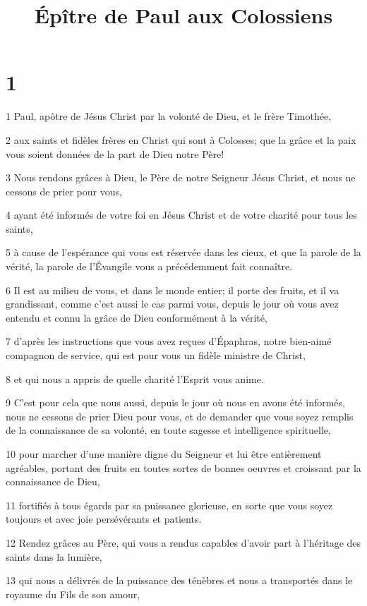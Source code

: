 

\title{Épître de Paul aux Colossiens}


\chapter{1}

\par 1 Paul, apôtre de Jésus Christ par la volonté de Dieu, et le frère Timothée,
\par 2 aux saints et fidèles frères en Christ qui sont à Colosses; que la grâce et la paix vous soient données de la part de Dieu notre Père!
\par 3 Nous rendons grâces à Dieu, le Père de notre Seigneur Jésus Christ, et nous ne cessons de prier pour vous,
\par 4 ayant été informés de votre foi en Jésus Christ et de votre charité pour tous les saints,
\par 5 à cause de l'espérance qui vous est réservée dans les cieux, et que la parole de la vérité, la parole de l'Évangile vous a précédemment fait connaître.
\par 6 Il est au milieu de vous, et dans le monde entier; il porte des fruits, et il va grandissant, comme c'est aussi le cas parmi vous, depuis le jour où vous avez entendu et connu la grâce de Dieu conformément à la vérité,
\par 7 d'après les instructions que vous avez reçues d'Épaphras, notre bien-aimé compagnon de service, qui est pour vous un fidèle ministre de Christ,
\par 8 et qui nous a appris de quelle charité l'Esprit vous anime.
\par 9 C'est pour cela que nous aussi, depuis le jour où nous en avons été informés, nous ne cessons de prier Dieu pour vous, et de demander que vous soyez remplis de la connaissance de sa volonté, en toute sagesse et intelligence spirituelle,
\par 10 pour marcher d'une manière digne du Seigneur et lui être entièrement agréables, portant des fruits en toutes sortes de bonnes oeuvres et croissant par la connaissance de Dieu,
\par 11 fortifiés à tous égards par sa puissance glorieuse, en sorte que vous soyez toujours et avec joie persévérants et patients.
\par 12 Rendez grâces au Père, qui vous a rendus capables d'avoir part à l'héritage des saints dans la lumière,
\par 13 qui nous a délivrés de la puissance des ténèbres et nous a transportés dans le royaume du Fils de son amour,
